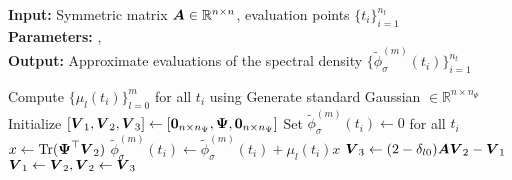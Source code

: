 \hspace*{\algorithmicindent} \textbf{Input:} Symmetric matrix $\boldsymbol{A} \in \mathbb{R}^{n \times n}$, evaluation points $\{t_i\}_{i=1}^{n_t}$ \\
\hspace*{\algorithmicindent} \textbf{Parameters:} ,  \\
\hspace*{\algorithmicindent} \textbf{Output:} Approximate evaluations of the spectral density $\{\widetilde{\phi}_{\sigma}^{(m)}(t_i)\}_{i=1}^{n_t}$
\begin{algorithmic}[1]
    \State Compute $\{\mu_l(t_i)\}_{l=0}^{m}$ for all $t_i$ using 
    \State Generate standard Gaussian  $\in \mathbb{R}^{n \times n_{\Psi}}$
    \State Initialize $[\boldsymbol{V}_1, \boldsymbol{V}_2, \boldsymbol{V}_3] \gets [\boldsymbol{0}_{n \times n_{\Psi}}, \boldsymbol{\Psi}, \boldsymbol{0}_{n \times n_{\Psi}}]$
    \State Set $\widetilde{\phi}_{\sigma}^{(m)}(t_i) \gets 0$ for all $t_i$
      \State $x \gets \operatorname{Tr}(\boldsymbol{\Psi}^{\top} \boldsymbol{V}_2)$ \label{lin:2-chebyshev-fast-trace}   \label{lin:2-chebyshev-linear-mapping}
        \State $\widetilde{\phi}_{\sigma}^{(m)}(t_i) \gets \widetilde{\phi}_{\sigma}^{(m)}(t_i) + \mu_l(t_i) x$
      \EndFor
      \State $\boldsymbol{V}_3 \gets (2 - \delta_{l0}) \boldsymbol{A} \boldsymbol{V}_2 - \boldsymbol{V}_1$ 
      \State $\boldsymbol{V}_1 \gets \boldsymbol{V}_2, \boldsymbol{V}_2 \gets \boldsymbol{V}_3$
    \EndFor
\end{algorithmic}

